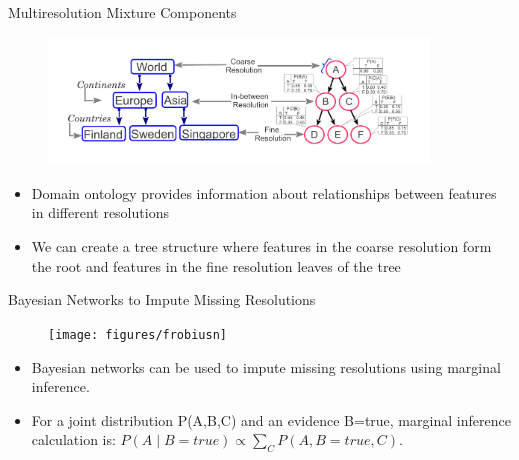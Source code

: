 \documentclass[first=dgreen,second=purple,logo=redexc]{aaltoslides}
\newcommand\FrameText[1]{%
  \begin{textblock*}{0.98\textwidth}(0.2\textwidth,0.95\textheight)
    \textcolor {blue}{\scriptsize\raggedright #1\hspace{0.1\textwidth}}
  \end{textblock*}}
\begin{document}

\begin{frame} {Multiresolution Mixture Components} 

      \begin{figure}
      \centering
      \includegraphics[trim=1cm 1cm 1cm 0cm, clip=true, width=0.9\textwidth]{figures/bnnfig1}
      \end{figure}
      
      \begin{itemize}\setlength{\itemsep}{2.5mm}
\item Domain ontology provides information about relationships between features in different resolutions
\item We can create a tree structure where features in the coarse resolution form the root and features in the fine resolution leaves of the tree
\end{itemize}
\end{frame}



\begin{frame} {Bayesian Networks to Impute Missing Resolutions} 

      \begin{figure}
      \centering
      \texttt{[image: figures/frobiusn]}
      \end{figure}
      
      \begin{itemize}\setlength{\itemsep}{1mm}
      
      \small
\item Bayesian networks can be used to impute missing resolutions using marginal inference. 
\item For a joint distribution P(A,B,C) and an evidence B=true, marginal inference calculation is:
\hspace{5mm} $P(A\mid B=true) \propto \displaystyle\sum_C P(A,B=true,C). $


\end{itemize}

\end{frame}
\end{document}
